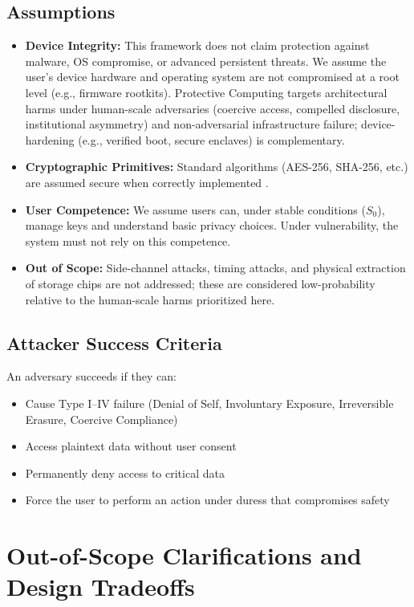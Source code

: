 \documentclass[12pt]{article}
\begin{document}
\subsection{Assumptions}
\begin{itemize}
\item \textbf{Device Integrity:} This framework does not claim protection against malware, OS compromise, or advanced persistent threats. We assume the user's device hardware and operating system are not compromised at a root level (e.g., firmware rootkits). Protective Computing targets architectural harms under human-scale adversaries (coercive access, compelled disclosure, institutional asymmetry) and non-adversarial infrastructure failure; device-hardening (e.g., verified boot, secure enclaves) is complementary.
\item \textbf{Cryptographic Primitives:} Standard algorithms (AES-256, SHA-256, etc.) are assumed secure when correctly implemented \cite{nistfips197upd1,nistfips1804}.
\item \textbf{User Competence:} We assume users can, under stable conditions ($S_0$), manage keys and understand basic privacy choices. Under vulnerability, the system must not rely on this competence.
\item \textbf{Out of Scope:} Side-channel attacks, timing attacks, and physical extraction of storage chips are not addressed; these are considered low-probability relative to the human-scale harms prioritized here.
\end{itemize}

\subsection{Attacker Success Criteria}
An adversary succeeds if they can:
\begin{itemize}
\item Cause Type I--IV failure (Denial of Self, Involuntary Exposure, Irreversible Erasure, Coercive Compliance)
\item Access plaintext data without user consent
\item Permanently deny access to critical data
\item Force the user to perform an action under duress that compromises safety
\end{itemize}

\section{Out-of-Scope Clarifications and Design Tradeoffs}
\end{document}
